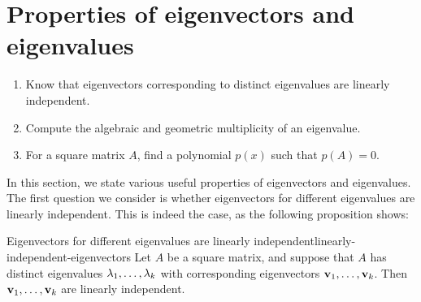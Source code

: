 \section{Properties of eigenvectors and eigenvalues}

\begin{outcome}
  \begin{enumerate}
  \item Know that eigenvectors corresponding to distinct eigenvalues
    are linearly independent.
  \item Compute the algebraic and geometric multiplicity of an
    eigenvalue.
  \item For a square matrix $A$, find a polynomial $p(x)$ such that $p(A)=0$.
  \end{enumerate}
\end{outcome}

In this section, we state various useful properties of eigenvectors
and eigenvalues. The first question we consider is whether
eigenvectors for different eigenvalues are linearly independent. This
is indeed the case, as the following proposition shows:

\begin{proposition}{Eigenvectors for different eigenvalues are linearly independent}{linearly-independent-eigenvectors}
  Let $A$ be a square matrix, and suppose that $A$ has distinct
  eigenvalues $\lambda_1,\ldots,\lambda_k$ with
  corresponding eigenvectors $\mbox{\bf v}_1,\ldots,\mbox{\bf v}_k$.
  Then $\mbox{\bf v}_1,\ldots,\mbox{\bf v}_k$ are linearly independent.
\end{proposition}

